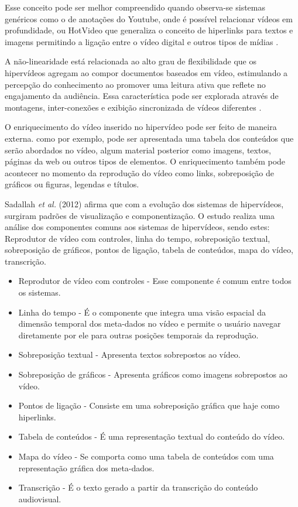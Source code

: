 Esse conceito pode ser melhor compreendido quando observa-se sistemas genéricos como o de anotações do Youtube, onde é possível relacionar vídeos em profundidade, ou HotVideo que generaliza o conceito de hiperlinks para textos e imagens permitindo a ligação entre o vídeo digital e outros tipos de mídias \cite{sadallah2012, finke2004, faga2010}.

A não-linearidade está relacionada ao alto grau de flexibilidade que os hipervídeos agregam ao compor documentos baseados em vídeo, estimulando a percepção do conhecimento ao promover uma leitura ativa que reflete no engajamento da audiência. Essa característica pode ser explorada através de montagens, inter-conexões e exibição sincronizada de vídeos diferentes \cite{sadallah2012}.

O enriquecimento do vídeo inserido no hipervídeo pode ser feito de maneira externa. como por exemplo, pode ser apresentada uma tabela dos conteúdos que serão abordados no vídeo, algum material posterior como imagens, textos, páginas da web ou outros tipos de elementos. O enriquecimento também pode acontecer no momento da reprodução do vídeo como links, sobreposição de gráficos ou figuras, legendas e títulos.

Sadallah \textit{et al.} (2012) afirma que com a evolução dos sistemas de hipervídeos, surgiram padrões de visualização e componentização. O estudo realiza uma análise dos componentes comuns aos sistemas de hipervídeos, sendo estes: Reprodutor de vídeo com controles, linha do tempo, sobreposição textual, sobreposição de gráficos, pontos de ligação, tabela de conteúdos, mapa do vídeo, transcrição.

\begin{itemize}
	\item Reprodutor de vídeo com controles - Esse componente é comum entre todos os sistemas.
	\item Linha do tempo - É o componente que integra uma visão espacial da dimensão temporal dos meta-dados no vídeo e permite o usuário navegar diretamente por ele para outras posições temporais da reprodução.
	\item Sobreposição textual - Apresenta textos sobrepostos ao vídeo.
	\item Sobreposição de gráficos - Apresenta gráficos como imagens sobrepostos ao vídeo.
	\item Pontos de ligação - Consiste em uma sobreposição gráfica que haje como hiperlinks.
	\item Tabela de conteúdos - É uma representação textual do conteúdo do vídeo.
	\item Mapa do vídeo - Se comporta como uma tabela de conteúdos com uma representação gráfica dos meta-dados.
	\item Transcrição - É o texto gerado a partir da transcrição do conteúdo audiovisual.
\end{itemize} 

